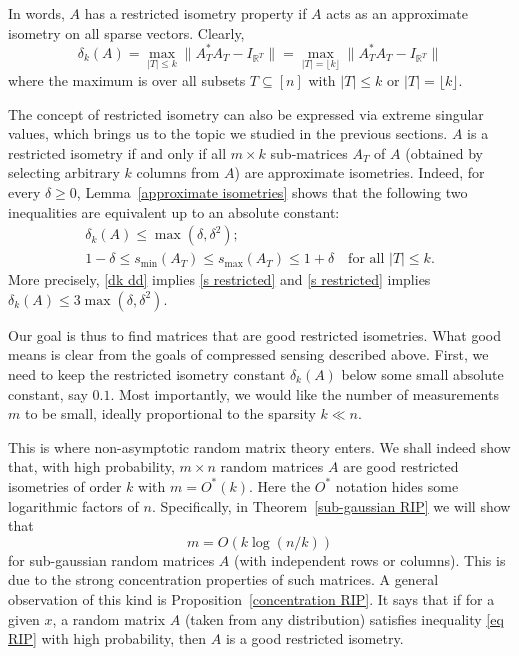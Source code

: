 \documentclass[10pt, openany]{book}
\theoremstyle{remark}
\def \R {\mathbb{R}}
\def \d {\delta}
\def \smin {s_{\min}}
\def \smax {s_{\max}}
\begin{document}
In words, $A$ has a restricted isometry property if $A$ acts as an approximate isometry 
on all sparse vectors. Clearly,
\begin{equation}							\label{equiv RIP}
\d_k(A) = \max_{|T| \le k} \|A_T^* A_T - I_{\R^T}\|
= \max_{|T| = \lfloor k \rfloor} \|A_T^* A_T - I_{\R^T}\|
\end{equation}
where the maximum is over all subsets $T \subseteq [n]$ with $|T| \le k$ or $|T| = \lfloor k \rfloor$.

The concept of restricted isometry can also be expressed via extreme singular values, 
which brings us to the topic we studied in the previous sections. $A$ is a restricted isometry 
if and only if all $m \times k$ sub-matrices $A_T$ of $A$
(obtained by selecting arbitrary $k$ columns from $A$) are approximate isometries. 
Indeed, for every $\d \ge 0$, Lemma~\ref{approximate isometries} shows that 
the following two inequalities are equivalent up to an absolute constant: 
\begin{gather}							
\d_k(A) \le \max(\d,\d^2);						\label{dk dd}		\\					
1-\d \le \smin(A_T) \le \smax(A_T) \le 1+\d		\label{s restricted}
\quad \text{for all } |T| \le k.
\end{gather}
More precisely, \eqref{dk dd} implies \eqref{s restricted} and
\eqref{s restricted} implies $\d_k(A) \le 3\max(\d,\d^2)$.

\medskip

Our goal is thus to find matrices that are good restricted isometries. What good means is clear
from the goals of compressed sensing described above. First, we need to keep 
the restricted isometry constant $\d_k(A)$ below some small absolute constant, say $0.1$. 
Most importantly, we would like the number of measurements $m$ to be small, ideally 
proportional to the sparsity $k \ll n$. 

This is where non-asymptotic random matrix theory enters. 
We shall indeed show that, with high probability, 
$m \times n$ random matrices $A$ are good restricted isometries of order $k$ 
with $m = O^*(k)$. Here the $O^*$ notation hides some logarithmic factors of $n$. 
Specifically, in Theorem~\ref{sub-gaussian RIP} we will show that
$$
m = O(k \log(n/k))
$$
for sub-gaussian random matrices $A$ (with independent rows or columns). 
This is due to the strong concentration properties of such matrices. 
A general observation of this kind is Proposition~\ref{concentration RIP}. 
It says that if for a given $x$, a random matrix $A$ (taken from any distribution) satisfies inequality \eqref{eq RIP}
with high probability, then $A$ is a good restricted isometry.
\end{document}
